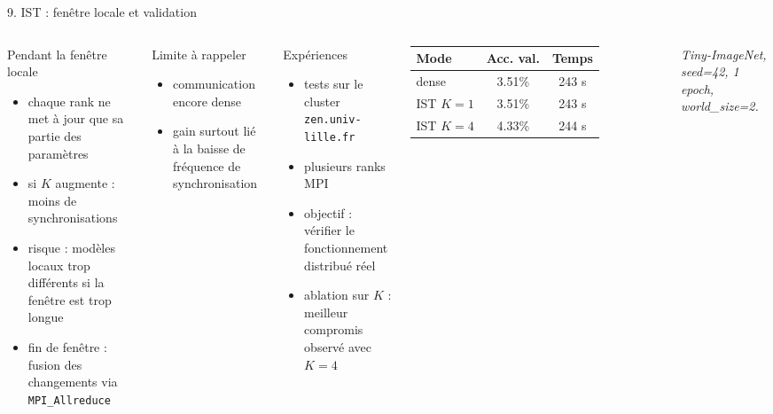 \documentclass[aspectratio=169]{beamer}
\begin{document}
\begin{frame}{9. IST : fenêtre locale et validation}
\scriptsize
\begin{columns}[T,totalwidth=\textwidth]
\begin{block}{Pendant la fenêtre locale}
\begin{itemize}
  \item chaque rank ne met à jour que sa partie des paramètres
  \item si $K$ augmente : moins de synchronisations
  \item risque : modèles locaux trop différents si la fenêtre est trop longue
  \item fin de fenêtre : fusion des changements via \texttt{MPI\_Allreduce}
\end{itemize}
\end{block}

\begin{alertblock}{Limite à rappeler}
\begin{itemize}
  \item communication encore dense
  \item gain surtout lié à la baisse de fréquence de synchronisation
\end{itemize}
\end{alertblock}

\begin{block}{Expériences}
\begin{itemize}
  \item tests sur le cluster \texttt{zen.univ-lille.fr}
  \item plusieurs ranks MPI
  \item objectif : vérifier le fonctionnement distribué réel
  \item ablation sur $K$ : meilleur compromis observé avec $K=4$
\end{itemize}
\end{block}

\medskip
\centering
\begin{tabular}{lcc}
\toprule
Mode & Acc. val. & Temps \\
\midrule
dense & 3.51\% & 243 s \\
IST $K=1$ & 3.51\% & 243 s \\
IST $K=4$ & 4.33\% & 244 s \\
\bottomrule
\end{tabular}

\vspace{0.15cm}
\textit{Tiny-ImageNet, seed=42, 1 epoch, world\_size=2.}
\end{columns}
\end{frame}
\end{document}
